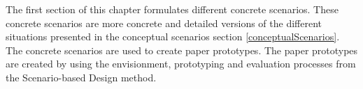 The first section of this chapter formulates different concrete scenarios. These concrete scenarios are more concrete and detailed versions of the different situations presented in the conceptual scenarios section \cref{conceptualScenarios}. The concrete scenarios are used to create paper prototypes. The paper prototypes are created by using the envisionment, prototyping and evaluation processes from the Scenario-based Design method.
